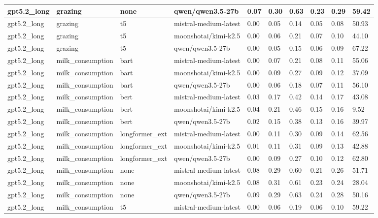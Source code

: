 \begin{tabular}{|l|l|l|l|l|l|l|l|l|l|}
 \hline
 gpt5.2\_long & grazing & none & qwen/qwen3.5-27b & 0.07 & 0.30 & 0.63 & 0.23 & 0.29 & 59.42 \\
 \hline
 gpt5.2\_long & grazing & t5 & mistral-medium-latest & 0.00 & 0.05 & 0.14 & 0.05 & 0.08 & 50.93 \\
 \hline
 gpt5.2\_long & grazing & t5 & moonshotai/kimi-k2.5 & 0.00 & 0.06 & 0.21 & 0.07 & 0.10 & 44.10 \\
 \hline
 gpt5.2\_long & grazing & t5 & qwen/qwen3.5-27b & 0.00 & 0.05 & 0.15 & 0.06 & 0.09 & 67.22 \\
 \hline
 gpt5.2\_long & milk\_consumption & bart & mistral-medium-latest & 0.00 & 0.07 & 0.21 & 0.08 & 0.11 & 55.06 \\
 \hline
 gpt5.2\_long & milk\_consumption & bart & moonshotai/kimi-k2.5 & 0.00 & 0.09 & 0.27 & 0.09 & 0.12 & 37.09 \\
 \hline
 gpt5.2\_long & milk\_consumption & bart & qwen/qwen3.5-27b & 0.00 & 0.06 & 0.18 & 0.07 & 0.11 & 56.10 \\
 \hline
 gpt5.2\_long & milk\_consumption & bert & mistral-medium-latest & 0.03 & 0.17 & 0.42 & 0.14 & 0.17 & 43.08 \\
 \hline
 gpt5.2\_long & milk\_consumption & bert & moonshotai/kimi-k2.5 & 0.04 & 0.21 & 0.46 & 0.15 & 0.16 & 9.52 \\
 \hline
 gpt5.2\_long & milk\_consumption & bert & qwen/qwen3.5-27b & 0.02 & 0.15 & 0.38 & 0.13 & 0.16 & 39.97 \\
 \hline
 gpt5.2\_long & milk\_consumption & longformer\_ext & mistral-medium-latest & 0.00 & 0.11 & 0.30 & 0.09 & 0.14 & 62.56 \\
 \hline
 gpt5.2\_long & milk\_consumption & longformer\_ext & moonshotai/kimi-k2.5 & 0.01 & 0.11 & 0.31 & 0.09 & 0.13 & 42.88 \\
 \hline
 gpt5.2\_long & milk\_consumption & longformer\_ext & qwen/qwen3.5-27b & 0.00 & 0.09 & 0.27 & 0.10 & 0.12 & 62.80 \\
 \hline
 gpt5.2\_long & milk\_consumption & none & mistral-medium-latest & 0.08 & 0.29 & 0.60 & 0.21 & 0.26 & 51.71 \\
 \hline
 gpt5.2\_long & milk\_consumption & none & moonshotai/kimi-k2.5 & 0.08 & 0.31 & 0.61 & 0.23 & 0.24 & 28.04 \\
 \hline
 gpt5.2\_long & milk\_consumption & none & qwen/qwen3.5-27b & 0.09 & 0.29 & 0.63 & 0.24 & 0.28 & 50.16 \\
 \hline
 gpt5.2\_long & milk\_consumption & t5 & mistral-medium-latest & 0.00 & 0.06 & 0.19 & 0.06 & 0.10 & 59.22 \\

\end{tabular}
